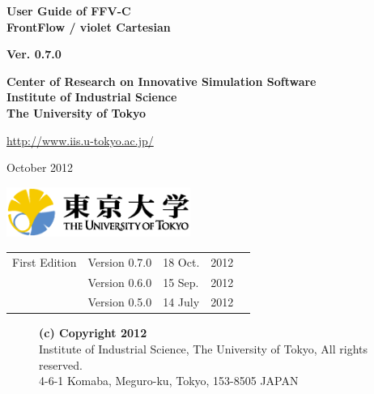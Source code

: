 \documentclass[a4paper,10pt,oneside,fleqn]{jsbook}
\begin{document}
\begin{titlepage}
\begin{center}
\vspace*{3cm}
{\huge \textbf{User Guide of FFV-C}}\\
\vspace{0.2cm}
{\huge \textbf{FrontFlow / violet Cartesian}}\\
\vspace{1cm}

{\large \textbf{Ver. 0.7.0}}\\
\vspace{1.5cm}

{\large \textbf{Center of Research on Innovative Simulation Software}\\
\vspace{0.1cm}
\large \textbf{Institute of Industrial Science}\\
\large \textbf{The University of Tokyo}\\
\vspace{1cm}
}


\url{http://www.iis.u-tokyo.ac.jp/}\\
\vspace{1cm}

October 2012\\
\vspace{4cm}

\includegraphics[width=6cm]{UT.eps}

\end{center}
\end{titlepage}
\newpage

%
\frontmatter

\begin{tabular}{llllr}
First Edition  &  Version 0.7.0  &  18 Oct. & 2012\\
               &  Version 0.6.0  &  15 Sep. & 2012\\
               &  Version 0.5.0  &  14 July & 2012\\
               
               

\end{tabular}

\vspace{15cm}

\begin{description}
\item[ ] \textbf{(c) Copyright 2012}\\
Institute of Industrial Science, The University of Tokyo, All rights reserved.\\
4-6-1 Komaba, Meguro-ku, Tokyo, 153-8505 JAPAN\\
\end{description}
\end{document}
